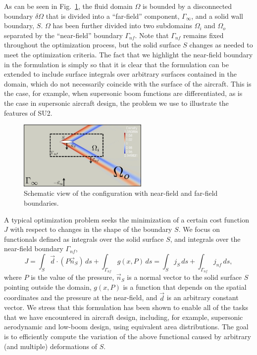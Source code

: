 \documentclass[]{aiaa-tc}
\begin{document}
%
As can be seen in Fig.~\ref{fig:sketch}, the fluid domain $\Omega$ is bounded by a disconnected boundary $\delta \Omega$ that is divided into a ``far-field'' component, $\Gamma_\infty$, and a solid wall boundary, $S$. $\Omega$ has been further divided into two subdomains $\Omega_i$ and $\Omega_o$ separated by the ``near-field'' boundary $\Gamma_{nf}$. Note that $\Gamma_{nf}$ remains fixed throughout the optimization process, but the solid surface $S$ changes as needed to meet the optimization criteria.  The fact that we highlight the near-field boundary in the formulation is simply so that it is clear that the formulation can be extended to include surface integrals over arbitrary surfaces contained in the domain, which do not necessarily coincide with the surface of the aircraft.  This is the case, for example, when supersonic boom functions are differentiated, as is the case in supersonic aircraft design, the problem we use to illustrate the features of SU2.
%
\begin{figure}
  \begin{center}
	\includegraphics[bb = 0 0 720 378,width=0.56\textwidth]{images/sketch.jpg}
	\caption{Schematic view of the configuration with near-field and far-field boundaries.}\label{fig:sketch}
  \end{center}
\end{figure}
%
%
A typical optimization problem seeks the minimization of a certain cost function $J$ with respect to changes in the shape of the boundary $S$. We focus on functionals defined as integrals over the solid surface $S$, and integrals over the near-field boundary $\Gamma_{nf}$,
\begin{equation}
J =\int_S{\vec d \cdot (P \vec n_S)\,ds}+\int_{\Gamma_{nf}}{g(x,P)\,ds} = \int_S{j_S\,ds}+\int_{\Gamma_{nf}}{j_{nf}\,ds},
\end{equation}
where $P$ is the value of the pressure, $\vec n_S$ is a normal vector to the solid surface $S$ pointing outside the domain, $g(x, P)$ is a function that depends on the spatial coordinates and the pressure at the near-field, and $\vec d$ is an arbitrary constant vector. We stress that this formulation has been shown to enable all of the tasks that we have encountered in aircraft design, including, for example, supersonic aerodynamic and low-boom design, using equivalent area distributions. The goal is to efficiently compute the variation of the above functional caused by arbitrary (and multiple) deformations of $S$.
\end{document}
